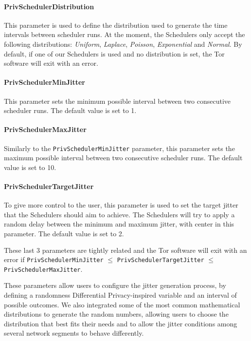 \paragraph{PrivSchedulerDistribution} This parameter is used to define the distribution used to generate the time intervals between scheduler runs. At the moment, the Schedulers only accept the following distributions: \textit{Uniform}, \textit{Laplace}, \textit{Poisson}, \textit{Exponential} and \textit{Normal}. By default, if one of our Schedulers is used and no distribution is set, the Tor software will exit with an error.

\paragraph{PrivSchedulerMinJitter} This parameter sets the minimum possible interval between two consecutive scheduler runs. The default value is set to 1.

\paragraph{PrivSchedulerMaxJitter} Similarly to the \texttt{PrivSchedulerMinJitter} parameter, this parameter sets the maximum possible interval between two consecutive scheduler runs. The default value is set to 10. 

\paragraph{PrivSchedulerTargetJitter} To give more control to the user, this parameter is used to set the target jitter that the Schedulers should aim to achieve. The Schedulers will try to apply a random delay between the minimum and maximum jitter, with center in this parameter. The default value is set to 2.\linebreak

These last 3 parameters are tightly related and the Tor software will exit with an error if \texttt{PrivSchedulerMinJitter} $\le$ \texttt{PrivSchedulerTargetJitter} $\le$ \texttt{PrivSchedulerMaxJitter}.

These parameters allow users to configure the jitter generation process, by defining a randomness Differential Privacy-inspired variable and an interval of possible outcomes. We also integrated some of the most common mathematical distributions to generate the random numbers, allowing users to choose the distribution that best fits their needs and to allow the jitter conditions among several network segments to behave differently.  
